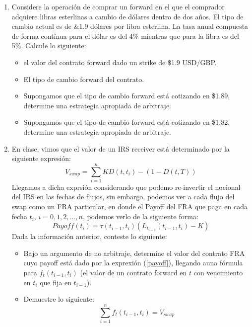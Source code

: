 \documentclass{article}
\begin{document}
\begin{enumerate}
\item  Considere la operación de comprar un forward en el que el comprador
        adquiere libras esterlinas a cambio de dólares dentro de dos años. El tipo de cambio
        actual es de \&1.9 dólares por libra esterlina. La tasa anual compuesta
        de forma contínua para el dólar es del 4\% mientras que para la libra
        es del 5\%. Calcule lo siguiente:
        \begin{itemize}
            \item el valor del contrato forward dado un strike de \$1.9 USD/GBP.
            \item El tipo de cambio forward del contrato.
            \item Supongamos que el tipo de cambio forward está cotizando en \$1.89, determine 
                  una estrategia apropiada de arbitraje.
            \item Supongamos que el tipo de cambio forward está cotizando en \$1.82, determine 
            una estrategia apropiada de arbitraje.
        \end{itemize}

\item En clase, vimos que el valor de un IRS receiver está determinado por la siguiente expresión:
        \begin{equation} \label{swap}
            V_{swap} = \sum_{i=1}^{n} K D (t,t_i)  - (1-D(t,T))
        \end{equation}
     Llegamos a dicha exprsión considerando que podemo re-invertir el nocional del IRS en las fechas de flujos, sin embargo, podemos ver a cada flujo del swap como un FRA
     particular, en donde el Payoff del FRA que paga en cada fecha $t_i$, $i = 0, 1,2, ... ,n$, podemos verlo de la siguiente forma:
        \begin{equation} \label{payoff}
            Payoff(t_i) = \tau(t_{i-1},t_i)(L_{t_{i-1}}(t_{i-1},t_i)-K)
        \end{equation}
    Dada la información anterior, conteste lo siguiente:
    \begin{itemize}
        \item Bajo un argumento de no arbitraje, determine el valor del contrato FRA cuyo payoff
              está dado por la exprexión (\ref{payoff}), llegando auna fórmula para $f_t(t_{i-1},t_i)$ (el valor
              de un contrato forward en $t$ con vencimiento en $t_i$ que fija en $t_{i-1}$).
        
        \item Demuestre lo siguiente:
              \begin{equation}
                \sum_{i=1}^{n}f_t(t_{i-1},t_i) = V_{swap}
              \end{equation}
        

\end{itemize}
\end{enumerate}
\end{document}
